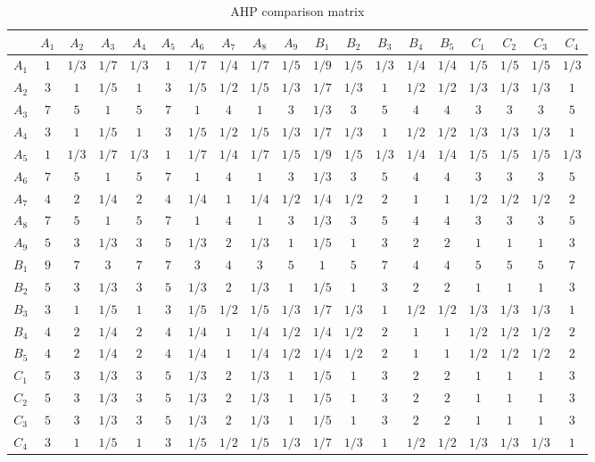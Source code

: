 \documentclass[12pt]{article}
\begin{document}
		{
			\fontsize{10}{18}\selectfont
			{
				\begin{longtable}{c|ccccccccc|ccccc||cccc}
					
					\caption{AHP comparison matrix}
					\label{tb:mat}\\
					
					\toprule
					&$A_1$&$A_2$&$A_3$&$A_4$&$A_5$&$A_6$&$A_7$&$A_8$&$A_9$&$B_1$&$B_2$&$B_3$&$B_4$&$B_5$&$C_1$&$C_2$&$C_3$&$C_4$\\
					\toprule
					$A_1$&$1$&$1/3$&$1/7$&$1/3$&$1$&$1/7$&$1/4$&$1/7$&$1/5$&$1/9$&$1/5$&$1/3$&$1/4$&$1/4$&$1/5$&$1/5$&$1/5$&$1/3$\\
					$A_2$&$3$&$1$&$1/5$&$1$&$3$&$1/5$&$1/2$&$1/5$&$1/3$&$1/7$&$1/3$&$1$&$1/2$&$1/2$&$1/3$&$1/3$&$1/3$&$1$\\
					$A_3$&$7$&$5$&$1$&$5$&$7$&$1$&$4$&$1$&$3$&$1/3$&$3$&$5$&$4$&$4$&$3$&$3$&$3$&$5$\\
					$A_4$&$3$&$1$&$1/5$&$1$&$3$&$1/5$&$1/2$&$1/5$&$1/3$&$1/7$&$1/3$&$1$&$1/2$&$1/2$&$1/3$&$1/3$&$1/3$&$1$\\
					$A_5$&$1$&$1/3$&$1/7$&$1/3$&$1$&$1/7$&$1/4$&$1/7$&$1/5$&$1/9$&$1/5$&$1/3$&$1/4$&$1/4$&$1/5$&$1/5$&$1/5$&$1/3$\\
					$A_6$&$7$&$5$&$1$&$5$&$7$&$1$&$4$&$1$&$3$&$1/3$&$3$&$5$&$4$&$4$&$3$&$3$&$3$&$5$\\
					$A_7$&$4$&$2$&$1/4$&$2$&$4$&$1/4$&$1$&$1/4$&$1/2$&$1/4$&$1/2$&$2$&$1$&$1$&$1/2$&$1/2$&$1/2$&$2$\\
					$A_8$&$7$&$5$&$1$&$5$&$7$&$1$&$4$&$1$&$3$&$1/3$&$3$&$5$&$4$&$4$&$3$&$3$&$3$&$5$\\
					$A_9$&$5$&$3$&$1/3$&$3$&$5$&$1/3$&$2$&$1/3$&$1$&$1/5$&$1$&$3$&$2$&$2$&$1$&$1$&$1$&$3$\\
					\midrule
					$B_1$&$9$&$7$&$3$&$7$&$7$&$3$&$4$&$3$&$5$&$1$&$5$&$7$&$4$&$4$&$5$&$5$&$5$&$7$\\
					$B_2$&$5$&$3$&$1/3$&$3$&$5$&$1/3$&$2$&$1/3$&$1$&$1/5$&$1$&$3$&$2$&$2$&$1$&$1$&$1$&$3$\\
					$B_3$&$3$&$1$&$1/5$&$1$&$3$&$1/5$&$1/2$&$1/5$&$1/3$&$1/7$&$1/3$&$1$&$1/2$&$1/2$&$1/3$&$1/3$&$1/3$&$1$\\
					$B_4$&$4$&$2$&$1/4$&$2$&$4$&$1/4$&$1$&$1/4$&$1/2$&$1/4$&$1/2$&$2$&$1$&$1$&$1/2$&$1/2$&$1/2$&$2$\\
					$B_5$&$4$&$2$&$1/4$&$2$&$4$&$1/4$&$1$&$1/4$&$1/2$&$1/4$&$1/2$&$2$&$1$&$1$&$1/2$&$1/2$&$1/2$&$2$\\
					\midrule
					\midrule
					$C_1$&$5$&$3$&$1/3$&$3$&$5$&$1/3$&$2$&$1/3$&$1$&$1/5$&$1$&$3$&$2$&$2$&$1$&$1$&$1$&$3$\\
					$C_2$&$5$&$3$&$1/3$&$3$&$5$&$1/3$&$2$&$1/3$&$1$&$1/5$&$1$&$3$&$2$&$2$&$1$&$1$&$1$&$3$\\
					$C_3$&$5$&$3$&$1/3$&$3$&$5$&$1/3$&$2$&$1/3$&$1$&$1/5$&$1$&$3$&$2$&$2$&$1$&$1$&$1$&$3$\\
					$C_4$&$3$&$1$&$1/5$&$1$&$3$&$1/5$&$1/2$&$1/5$&$1/3$&$1/7$&$1/3$&$1$&$1/2$&$1/2$&$1/3$&$1/3$&$1/3$&$1$\\
					\bottomrule
				\end{longtable}
			}
		}	
		
\end{document}
